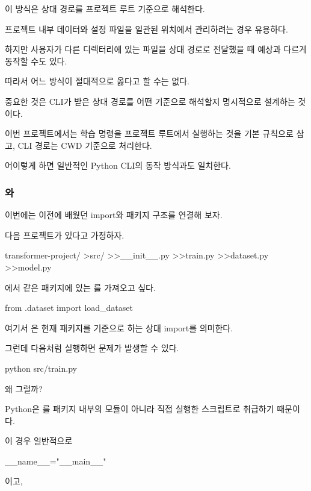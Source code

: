 이 방식은 상대 경로를 프로젝트 루트 기준으로 해석한다.

프로젝트 내부 데이터와 설정 파일을 일관된 위치에서 관리하려는 경우 유용하다.

하지만 사용자가 다른 디렉터리에 있는 파일을 상대 경로로 전달했을 때 예상과 다르게 동작할 수도 있다.

따라서 어느 방식이 절대적으로 옳다고 할 수는 없다.

중요한 것은 CLI가 받은 상대 경로를 어떤 기준으로 해석할지 명시적으로 설계하는 것이다.

이번 프로젝트에서는 학습 명령을 프로젝트 루트에서 실행하는 것을 기본 규칙으로 삼고, CLI 경로는 CWD 기준으로 처리한다.

어이렇게 하면 일반적인 Python CLI의 동작 방식과도 일치한다.

\subsubsection{와 }

이번에는 이전에 배웠던 import와 패키지 구조를 연결해 보자.

다음 프로젝트가 있다고 가정하자.

\begin{dhkdir}[in=6]
transformer-project/
>src/
>>__init__.py
>>train.py
>>dataset.py
>>model.py
\end{dhkdir}

에서 같은 패키지에 있는 를 가져오고 싶다.

\begin{dhkcode}
from .dataset import load_dataset
\end{dhkcode}

여기서 은 현재 패키지를 기준으로 하는 상대 import를 의미한다.

그런데 다음처럼 실행하면 문제가 발생할 수 있다.

\begin{dhkzsh}
python src/train.py
\end{dhkzsh}

왜 그럴까?

Python은 를 패키지 내부의 모듈이 아니라 직접 실행한 스크립트로 취급하기 때문이다.

이 경우 일반적으로

\begin{dhkzsh}
__name__="__main__"
\end{dhkzsh}

이고,

